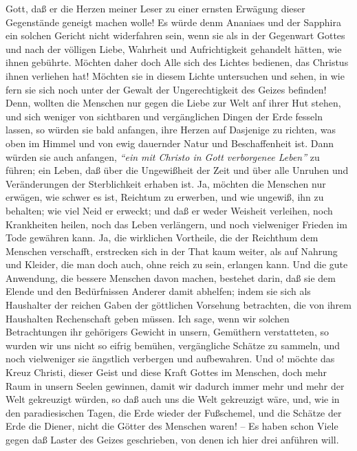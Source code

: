 Gott, daß er die Herzen meiner Leser zu einer ernsten Erwägung dieser
Gegenstände geneigt machen wolle! Es würde denm Ananiaes und der Sapphira ein
solchen Gericht nicht widerfahren sein, wenn sie als in der Gegenwart Gottes und
nach der völligen Liebe, Wahrheit und Aufrichtigkeit gehandelt hätten, wie ihnen
gebührte. Möchten daher doch Alle sich des Lichtes bedienen, das Christus ihnen
verliehen hat! Möchten sie in diesem Lichte untersuchen und sehen, in wie fern
sie sich noch unter der Gewalt der Ungerechtigkeit des Geizes befinden! Denn,
wollten die Menschen nur gegen die Liebe zur Welt anf ihrer Hut stehen, und sich
weniger von sichtbaren und vergänglichen Dingen der
Erde fesseln lassen, so
würden sie bald anfangen, ihre Herzen auf Dasjenige zu richten, was oben im
Himmel und von ewig dauernder Natur und Beschaffenheit ist. Dann
würden sie auch
anfangen, \textit{"`ein mit Christo in Gott verborgenee Leben"'} zu führen; ein
Leben,
daß über die Ungewißheit der Zeit und über alle Unruhen und Veränderungen der
Sterblichkeit erhaben ist. Ja, möchten die Menschen nur erwägen, wie schwer es
ist, Reichtum zu erwerben, und wie ungewiß, ihn zu behalten; wie viel
Neid er
erweckt; und daß er weder Weisheit verleihen, noch Krankheiten heilen, noch das
Leben verlängern, und noch vielweniger Frieden im Tode gewähren kann. Ja, die
wirklichen Vortheile, die der Reichthum dem Menschen verschafft, erstrecken sich
in der That kaum weiter, als auf Nahrung und Kleider, die man doch auch, ohne
reich zu sein, erlangen kann. Und die gute Anwendung, die bessere Menschen davon
machen, bestehet darin, daß sie dem Elende und den Bedürfnissen Anderer damit
abhelfen; indem sie sich als Haushalter der reichen Gaben der göttlichen
Vorsehung betrachten, die von ihrem Haushalten Rechenschaft geben müssen. Ich
sage, wenn wir solchen Betrachtungen ihr gehörigers Gewicht in unsern, Gemüthern
verstatteten, so wurden wir uns nicht so eifrig bemühen, vergängliche Schätze zu
sammeln, und noch vielweniger sie ängstlich verbergen und aufbewahren. Und o!
möchte das Kreuz Christi, dieser Geist und diese Kraft Gottes im Menschen, doch
mehr Raum in unsern Seelen gewinnen, damit wir dadurch immer mehr und mehr der
Welt gekreuzigt würden, so daß auch uns die Welt
gekreuzigt wäre, und, wie in
den paradiesischen Tagen, die Erde wieder der Fußschemel, und die Schätze der
Erde die Diener, nicht die Götter des Menschen waren! -- Es haben schon Viele
gegen daß Laster des Geizes geschrieben, von denen ich hier drei anführen will.

